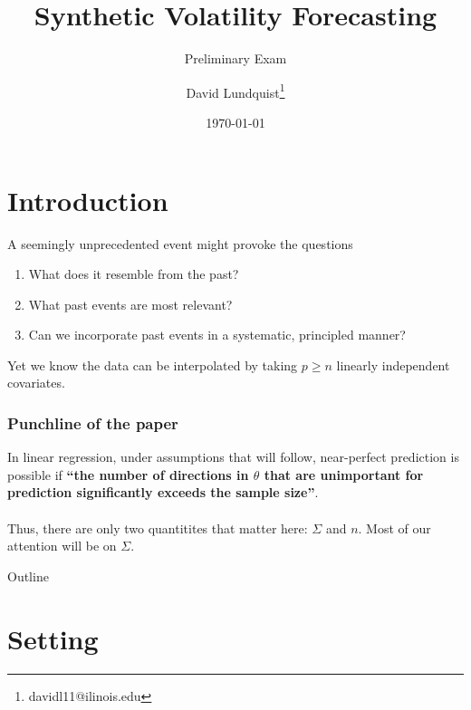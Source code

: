 \documentclass[pdf]{beamer}
\title{Synthetic Volatility Forecasting}
\subtitle{Preliminary Exam}
\author{David Lundquist\thanks{davidl11@ilinois.edu}}
\date{\today}
\begin{document}
\begin{frame}
\titlepage
\end{frame}

\section{Introduction}

\begin{frame}
A seemingly unprecedented event might provoke the questions

\begin{enumerate}
    \item What does it resemble from the past?
    \item What past events are most relevant?
    \item Can we incorporate past events in a systematic, principled manner? 

\end{enumerate}
\end{frame}
\begin{frame}

Yet we know the data can be interpolated by taking $p \geq n$ linearly independent covariates.

\end{frame}

\begin{frame}

\frametitle{Punchline of the paper}

In linear regression, under assumptions that will follow, near-perfect prediction is possible if \textbf{``the number of directions in $\theta$ that are unimportant for prediction significantly exceeds the sample size''}.\\~\\

Thus, there are only two quantitites that matter here: $\Sigma$ and $n$.  Most of our attention will be on $\Sigma$.
\end{frame}

\begin{frame}{Outline}
    \tableofcontents
\end{frame}

\section{Setting}
\end{document}
